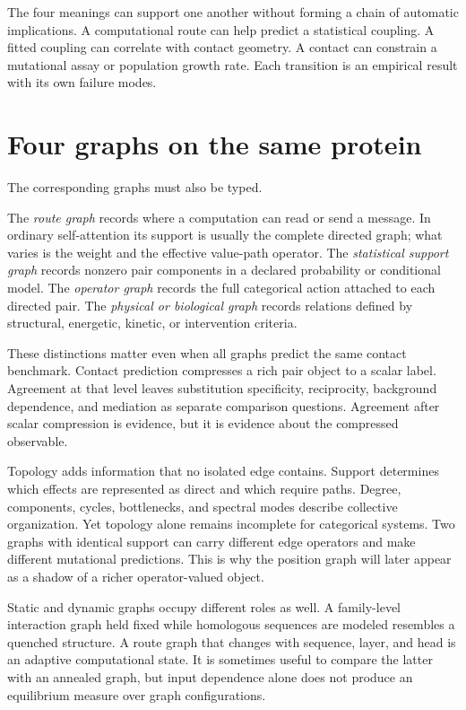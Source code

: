 The four meanings can support one another without forming a chain of automatic implications.  A
computational route can help predict a statistical coupling.  A fitted coupling can correlate
with contact geometry.  A contact can constrain a mutational assay or population growth rate.  Each transition is an
empirical result with its own failure modes.

\section{Four graphs on the same protein}

The corresponding graphs must also be typed.

The \emph{route graph} records where a computation can read or send a message.  In ordinary
self-attention its support is usually the complete directed graph; what varies is the weight and
the effective value-path operator.  The \emph{statistical support graph} records nonzero pair
components in a declared probability or conditional model.  The \emph{operator graph} records the
full categorical action attached to each directed pair.  The \emph{physical or biological graph}
records relations defined by structural, energetic, kinetic, or intervention criteria.

These distinctions matter even when all graphs predict the same contact benchmark.  Contact
prediction compresses a rich pair object to a scalar label.  Agreement at that level leaves
substitution specificity, reciprocity, background dependence, and mediation as separate comparison
questions.  Agreement after scalar
compression is evidence, but it is evidence about the compressed observable.

Topology adds information that no isolated edge contains.  Support determines which effects are
represented as direct and which require paths.  Degree, components, cycles, bottlenecks, and
spectral modes describe collective organization.  Yet topology alone remains incomplete for
categorical systems.  Two graphs with identical support can carry different edge operators and
make different mutational predictions.  This is why the position graph will later appear as a
shadow of a richer operator-valued object.

Static and dynamic graphs occupy different roles as well.  A family-level interaction graph held
fixed while homologous sequences are modeled resembles a quenched structure.  A route graph that
changes with sequence, layer, and head is an adaptive computational state.  It is sometimes useful
to compare the latter with an annealed graph, but input dependence alone does not produce an
equilibrium measure over graph configurations.

